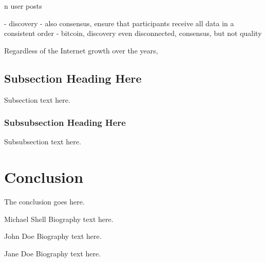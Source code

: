 \documentclass[10pt,journal,compsoc]{IEEEtran}
\begin{document}
n user posts 

- discovery
- also consensus, ensure that participants receive all data in a consistent order
- bitcoin, discovery even disconnected, consensus, but not quality


Regardless of the Internet growth over the years,

\subsection{Subsection Heading Here}
Subsection text here.

\subsubsection{Subsubsection Heading Here}
Subsubsection text here.

\section{Conclusion}
The conclusion goes here.




\begin{IEEEbiography}{Michael Shell}
Biography text here.
\end{IEEEbiography}

\begin{IEEEbiographynophoto}{John Doe}
Biography text here.
\end{IEEEbiographynophoto}

\begin{IEEEbiographynophoto}{Jane Doe}
Biography text here.
\end{IEEEbiographynophoto}
\end{document}
